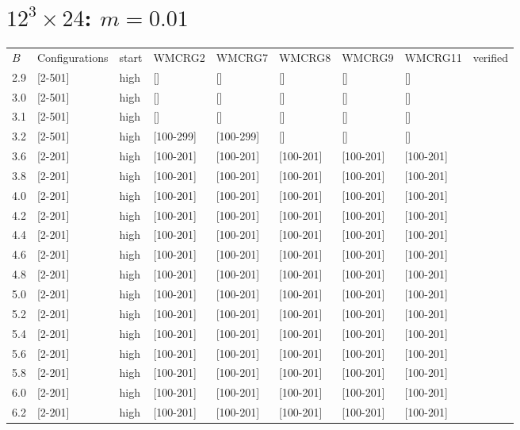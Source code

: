 \documentclass{article}
\begin{document}
  \section{$12^3\times24$:  $m=0.01$}
    \begin{tabular}{ l | l | l | l | l }
      \hline
      $B$ & Configurations & start & WMCRG2 & WMCRG7 & WMCRG8 & WMCRG9 & WMCRG11 & verified\\
      2.9 & [2-501] & high & [] & [] & [] & [] & [] &\\
      3.0 & [2-501] & high & [] & [] & [] & [] & [] &\\
      3.1 & [2-501] & high & [] & [] & [] & [] & [] &\\
      3.2 & [2-501] & high & [100-299] & [100-299] & [] & [] & [] &\\
      3.6 & [2-201] & high & [100-201] & [100-201] & [100-201] & [100-201] & [100-201] &\\
      3.8 & [2-201] & high & [100-201] & [100-201] & [100-201] & [100-201] & [100-201] &\\
      4.0 & [2-201] & high & [100-201] & [100-201] & [100-201] & [100-201] & [100-201] &\\
      4.2 & [2-201] & high & [100-201] & [100-201] & [100-201] & [100-201] & [100-201] &\\
      4.4 & [2-201] & high & [100-201] & [100-201] & [100-201] & [100-201] & [100-201] &\\
      4.6 & [2-201] & high & [100-201] & [100-201] & [100-201] & [100-201] & [100-201] &\\
      4.8 & [2-201] & high & [100-201] & [100-201] & [100-201] & [100-201] & [100-201] &\\
      5.0 & [2-201] & high & [100-201] & [100-201] & [100-201] & [100-201] & [100-201] &\\
      5.2 & [2-201] & high & [100-201] & [100-201] & [100-201] & [100-201] & [100-201] &\\
      5.4 & [2-201] & high & [100-201] & [100-201] & [100-201] & [100-201] & [100-201] &\\
      5.6 & [2-201] & high & [100-201] & [100-201] & [100-201] & [100-201] & [100-201] &\\
      5.8 & [2-201] & high & [100-201] & [100-201] & [100-201] & [100-201] & [100-201] &\\
      6.0 & [2-201] & high & [100-201] & [100-201] & [100-201] & [100-201] & [100-201] &\\
      6.2 & [2-201] & high & [100-201] & [100-201] & [100-201] & [100-201] & [100-201] &\\

\end{tabular}
\end{document}
